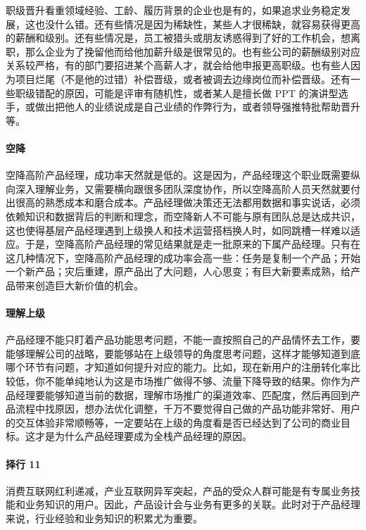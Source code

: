\documentclass[letterpaper,10pt,english]{sphinxmanual}
\begin{document}
职级晋升看重领域经验、工龄、履历背景的企业也是有的，如果追求业务稳定发展，这也没什么错。还有些情况是因为稀缺性，某些人才很稀缺，就容易获得更高的薪酬和级别。还有些情况是，员工被猎头或朋友诱惑得到了好的工作机会，想离职，那么企业为了挽留他而给他加薪升级是很常见的。也有些公司的薪酬级别对应关系较严格，有的部门要招进某个高薪人才，就会给他申报更高职级。也有些人因为项目烂尾（不是他的过错）补偿晋级，或者被调去边缘岗位而补偿晋级。还有一些职级错配的原因，可能是评审有随机性，或者某人是擅长做
PPT
的演讲型选手，或做出把他人的业绩说成是自己业绩的作弊行为，或者领导强推特批帮助晋升等。


\paragraph{空降}
\label{\detokenize{chapter_introduction/career_path:id22}}
空降高阶产品经理，成功率天然就是低的。这是因为，产品经理这个职业既需要纵向深入理解业务，又需要横向跟很多团队深度协作，所以空降高阶人员天然就要付出很高的熟悉成本和磨合成本。产品经理做决策还无法都用数据和事实说话，必须依赖知识和数据背后的判断和理念，而空降新人不可能与原有团队总是达成共识，这也使得基层产品经理遇到上级换人和技术运营搭档换人时，如同跳槽一样难以适应。于是，空降高阶产品经理的常见结果就是走一批原来的下属产品经理。只有在这几种情况下，空降高阶产品经理的成功率会高一些：任务是复制一个产品；开始一个新产品；灾后重建，原产品出了大问题，人心思变；有巨大新要素成熟，给产品带来创造巨大新价值的机会。


\paragraph{理解上级}
\label{\detokenize{chapter_introduction/career_path:id23}}
产品经理不能只盯着产品功能思考问题，不能一直按照自己的产品情怀去工作，要能够理解公司的战略，要能够站在上级领导的角度思考问题，这样才能够知道到底哪个环节有问题，才知道如何提升对应的能力。比如，现在新用户的注册转化率比较低，你不能单纯地认为这是市场推广做得不够、流量下降导致的结果。你作为产品经理要能够知道当前的数据，理解市场推广的渠道效率、匹配度，然后再回到产品流程中找原因，想办法优化调整，千万不要觉得自己做的产品功能非常好、用户的交互体验非常顺畅等，一定要站在上级的角度看是否已经达到了公司的商业目标。这才是为什么产品经理要成为全栈产品经理的原因。


\paragraph{择行 11\sphinxfootnotemark[367]}
\label{\detokenize{chapter_introduction/career_path:id24}}%
\begin{footnotetext}[367]\sphinxAtStartFootnote
{}
%
\end{footnotetext}\ignorespaces 
消费互联网红利递减，产业互联网异军突起，产品的受众人群可能是有专属业务技能和业务知识的用户。因此，产品设计会与业务有更多的关联。此时对于产品经理来说，行业经验和业务知识的积累尤为重要。
\end{document}
